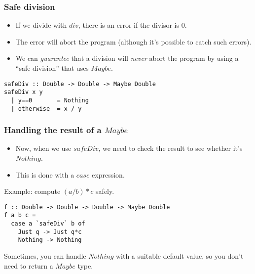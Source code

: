 \documentclass{beamer}
\begin{document}
\begin{frame}[fragile]
\frametitle{Safe division}

\begin{itemize}
\item If we divide with $div$, there is an error if the divisor is 0.
\item The error will abort the program (although it's possible to
  catch such errors).
\item We can \emph{guarantee} that a division will \emph{never}
  abort the program by using a ``safe division'' that uses $Maybe$.
\end{itemize}

\begin{verbatim}
safeDiv :: Double -> Double -> Maybe Double
safeDiv x y
  | y==0       = Nothing
  | otherwise  = x / y
\end{verbatim}

\end{frame}

\begin{frame}[fragile]
\frametitle{Handling the result of a $Maybe$}

\begin{itemize}
\item Now, when we use $safeDiv$, we need to check the result to
  see whether it's $Nothing$.
\item This is done with a $case$ expression.
\end{itemize}

Example: compute $(a/b)*c$ safely.

\begin{verbatim}
f :: Double -> Double -> Double -> Maybe Double
f a b c =
  case a `safeDiv` b of
    Just q -> Just q*c
    Nothing -> Nothing
  \end{verbatim}

Sometimes, you can handle $Nothing$ with a suitable default value,
so you don't need to return a $Maybe$ type.

\end{frame}
\end{document}
